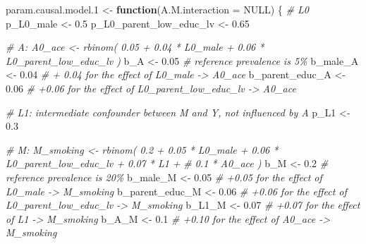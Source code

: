 \documentclass[
]{book}
\newenvironment{Shaded}{\begin{snugshade}}{\end{snugshade}}
\newcommand{\AttributeTok}[1]{\textcolor[rgb]{0.77,0.63,0.00}{#1}}
\newcommand{\CommentTok}[1]{\textcolor[rgb]{0.56,0.35,0.01}{\textit{#1}}}
\newcommand{\ConstantTok}[1]{\textcolor[rgb]{0.00,0.00,0.00}{#1}}
\newcommand{\ControlFlowTok}[1]{\textcolor[rgb]{0.13,0.29,0.53}{\textbf{#1}}}
\newcommand{\FloatTok}[1]{\textcolor[rgb]{0.00,0.00,0.81}{#1}}
\newcommand{\NormalTok}[1]{#1}
\newcommand{\OtherTok}[1]{\textcolor[rgb]{0.56,0.35,0.01}{#1}}
\begin{document}
\begin{Shaded}
\begin{Highlighting}[]
\NormalTok{param.causal.model}\FloatTok{.1} \OtherTok{\textless{}{-}} \ControlFlowTok{function}\NormalTok{(}\AttributeTok{A.M.interaction =} \ConstantTok{NULL}\NormalTok{) \{}
\CommentTok{\# L0}
\NormalTok{p\_L0\_male }\OtherTok{\textless{}{-}} \FloatTok{0.5}
\NormalTok{p\_L0\_parent\_low\_educ\_lv }\OtherTok{\textless{}{-}} \FloatTok{0.65}

\CommentTok{\# A: A0\_ace \textless{}{-} rbinom( 0.05 + 0.04 * L0\_male + 0.06 * L0\_parent\_low\_educ\_lv ) }
\NormalTok{b\_A }\OtherTok{\textless{}{-}} \FloatTok{0.05}   \CommentTok{\# reference prevalence is 5\%}
\NormalTok{b\_male\_A }\OtherTok{\textless{}{-}} \FloatTok{0.04}  \CommentTok{\# + 0.04 for the effect of L0\_male {-}\textgreater{} A0\_ace}
\NormalTok{b\_parent\_educ\_A }\OtherTok{\textless{}{-}} \FloatTok{0.06}  \CommentTok{\# +0.06 for the effect of L0\_parent\_low\_educ\_lv {-}\textgreater{} A0\_ace}

\CommentTok{\# L1: intermediate confounder between M and Y, not influenced by A}
\NormalTok{p\_L1 }\OtherTok{\textless{}{-}} \FloatTok{0.3}

\CommentTok{\# M: M\_smoking \textless{}{-} rbinom( 0.2 + 0.05 * L0\_male + 0.06 * L0\_parent\_low\_educ\_lv + 0.07 * L1 +}
\CommentTok{\#                         0.1 * A0\_ace ) }
\NormalTok{b\_M }\OtherTok{\textless{}{-}} \FloatTok{0.2} \CommentTok{\# reference prevalence is 20\%}
\NormalTok{b\_male\_M }\OtherTok{\textless{}{-}} \FloatTok{0.05} \CommentTok{\# +0.05 for the effect of L0\_male {-}\textgreater{} M\_smoking}
\NormalTok{b\_parent\_educ\_M }\OtherTok{\textless{}{-}} \FloatTok{0.06} \CommentTok{\# +0.06 for the effect of L0\_parent\_low\_educ\_lv {-}\textgreater{} M\_smoking}
\NormalTok{b\_L1\_M }\OtherTok{\textless{}{-}} \FloatTok{0.07} \CommentTok{\# +0.07 for the effect of L1 {-}\textgreater{} M\_smoking}
\NormalTok{b\_A\_M }\OtherTok{\textless{}{-}} \FloatTok{0.1} \CommentTok{\# +0.10 for the effect of A0\_ace {-}\textgreater{} M\_smoking}


\end{Highlighting}
\end{Shaded}
\end{document}
